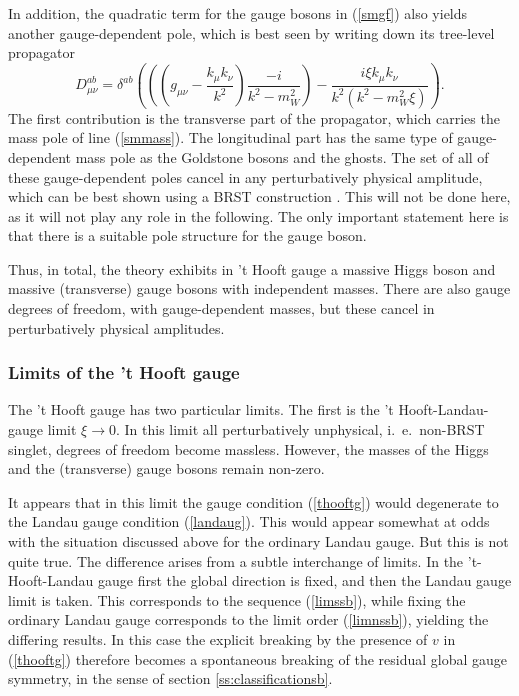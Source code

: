 \documentclass[final,12pt,3p,longtitle]{elsarticle}
\newcommand*{\no}{\noindent}
\newcommand*{\be}{\begin{equation}}
\newcommand*{\ee}{\end{equation}}
\newcommand*{\pref}[1]{(\ref{#1})}
\newcommand*{\mn}{{\mu\nu}}
\newcommand*{\1}{1\!\!\!\bot}
\begin{document}
In addition, the quadratic term for the gauge bosons in \pref{smgf} also yields another gauge-dependent pole, which is best seen by writing down its tree-level propagator \cite{Bohm:2001yx}
\be
D_\mn^{ab}=\delta^{ab}\left(\left(\left(g_\mn-\frac{k_\mu k_\nu}{k^2}\right)\frac{-i}{k^2-m_W^2}\right)-\frac{i\xi k_\mu k_\nu}{k^2(k^2-m_W^2\xi)}\right)\label{wprop}.
\ee
\no The first contribution is the transverse part of the propagator, which carries the mass pole of line \pref{smmass}. The longitudinal part has the same type of gauge-dependent mass pole as the Goldstone bosons and the ghosts. The set of all of these gauge-dependent poles cancel in any perturbatively physical amplitude, which can be best shown using a BRST construction \cite{Bohm:2001yx}. This will not be done here, as it will not play any role in the following. The only important statement here is that there is a suitable pole structure for the gauge boson.

Thus, in total, the theory exhibits in 't Hooft gauge a massive Higgs boson and massive (transverse) gauge bosons with independent masses. There are also gauge degrees of freedom, with gauge-dependent masses, but these cancel in perturbatively physical amplitudes.

\subsubsection{Limits of the 't Hooft gauge}

The 't Hooft gauge has two particular limits. The first is the 't Hooft-Landau-gauge limit $\xi\to 0$. In this limit all perturbatively unphysical, i.\ e.\ non-BRST singlet, degrees of freedom become massless. However, the masses of the Higgs and the (transverse) gauge bosons remain non-zero.

It appears that in this limit the gauge condition \pref{thooftg} would degenerate to the Landau gauge condition \pref{landaug}. This would appear somewhat at odds with the situation discussed above for the ordinary Landau gauge. But this is not quite true. The difference arises from a subtle interchange of limits. In the 't-Hooft-Landau gauge first the global direction is fixed, and then the Landau gauge limit is taken. This corresponds to the sequence \pref{limssb}, while fixing the ordinary Landau gauge corresponds to the limit order \pref{limnssb}, yielding the differing results. In this case the explicit breaking by the presence of $v$ in \pref{thooftg} therefore becomes a spontaneous breaking of the residual global gauge symmetry, in the sense of section \ref{ss:classificationsb}.
\end{document}
